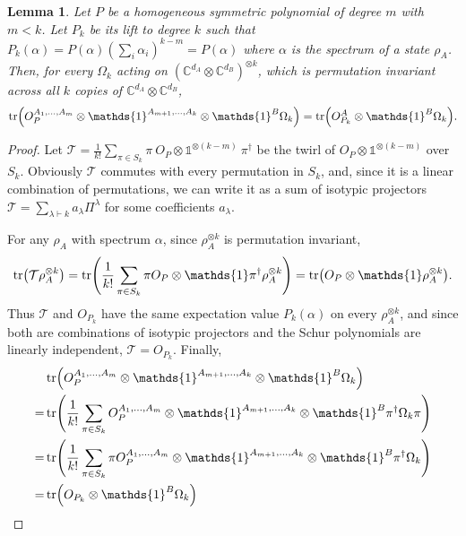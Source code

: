 \documentclass[aps,pra,twocolumn,showpacs,superscriptaddress,groupedaddress]{revtex4-2}
\newcommand{\one}[0]{\mathds{1}}
\renewcommand{\a}{\alpha}
\newcommand{\C}{\mathds{C}}
\newcommand{\I}{\one}
\newtheorem{lemma}      [theorem]{Lemma}
\begin{document}
\begin{widetext}
\begin{lemma}\label{lem:lifting}
    Let $P$ be a homogeneous symmetric polynomial of degree $m$ with $m < k$. Let $P_k$ be its lift to degree $k$ such that $P_k(\a) = P(\a) \left(\sum_i \a_i \right)^{k-m} = P(\a)$ where $\a$ is the spectrum of a state $\rho_A$.
    Then, for every $\Omega_k$ acting on $(\C^{d_A} \otimes \C^{d_B})^{\otimes k}$, which is permutation invariant across all $k$ copies of $\C^{d_A} \otimes \C^{d_B}$,
    \begin{equation}
        \tr(O_P^{A_1,\dots, A_m} \otimes \I^{A_{m+1}, \dots, A_k} \otimes \I^{B} \Omega_k) = \tr(O_{P_k}^A \otimes \I^B \Omega_k).
    \end{equation}
\end{lemma}
\begin{proof}
    Let $\mathcal{T} = \frac{1}{k!}\sum_{\pi \in S_k} \pi \ O_P \otimes \I^{\otimes (k-m)} \ \pi^\dagger$ be the twirl of $O_P \otimes \I^{\otimes (k-m)}$ over $S_k$. Obviously $\mathcal{T}$ commutes with every permutation in $S_k$, and, since it is a linear combination of permutations, we can write it as a sum of isotypic projectors $\mathcal{T} = \sum_{\lambda \vdash k} a_\lambda \Pi^\lambda$ for some coefficients $a_\lambda$.

    For any $\rho_A$ with spectrum $\a$, since $\rho_A^{\otimes k}$ is permutation invariant,
    \begin{equation}
        \tr(\mathcal{T}\rho_A^{\otimes k}) = \tr(\frac{1}{k!} \sum_{\pi \in S_k} \pi O_P \otimes \I \pi^\dagger \rho_A^{\otimes k})= \tr(O_P \otimes \I \rho_A^{\otimes k}).
    \end{equation}
    Thus $\mathcal{T}$ and $O_{P_k}$ have the same expectation value $P_k(\a)$ on every $\rho_A^{\otimes k}$, and since both are combinations of isotypic projectors and the Schur polynomials are linearly independent, $\mathcal{T} = O_{P_k}$.
    Finally,
    \begin{align}
        &\tr(O_P^{A_1,\dots, A_m} \otimes \I^{A_{m+1}, \dots, A_k} \otimes \I^{B} \Omega_k)\\
        =& \tr( \frac{1}{k!}\sum_{\pi \in S_k} O_P^{A_1,\dots, A_m} \otimes \I^{A_{m+1}, \dots, A_k} \otimes \I^{B} \pi^\dagger \Omega_k \pi)\\
        =& \tr( \frac{1}{k!}\sum_{\pi \in S_k}  \pi O_P^{A_1,\dots, A_m} \otimes \I^{A_{m+1}, \dots, A_k} \otimes \I^{B} \pi^\dagger \Omega_k)\\
        =& \tr( O_{P_k} \otimes \I^{B} \Omega_k)
    \end{align}
\end{proof}


\end{widetext}
\end{document}
